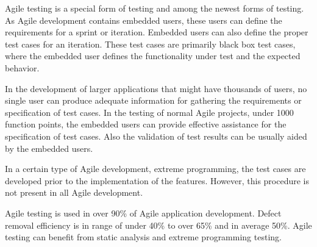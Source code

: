 Agile testing is a special form of testing and among the newest forms of testing. As Agile development contains embedded users, these users can define the requirements for a sprint or iteration. Embedded users can also define the proper test cases for an iteration. These test cases are primarily black box test cases, where the embedded user defines the functionality under test and the expected behavior.

In the development of larger applications that might have thousands of users, no single user can produce adequate information for gathering the requirements or specification of test cases. In the testing of normal Agile projects, under 1000 function points, the embedded users can provide effective assistance for the specification of test cases. Also the validation of test results can be usually aided by the embedded users.

In a certain type of Agile development, extreme programming, the test cases are developed prior to the implementation of the features. However, this procedure is not present in all Agile development.

Agile testing is used in over 90\% of Agile application development. Defect removal efficiency is in range of under 40\% to over 65\% and in average 50\%. Agile testing can benefit from static analysis and extreme programming testing.